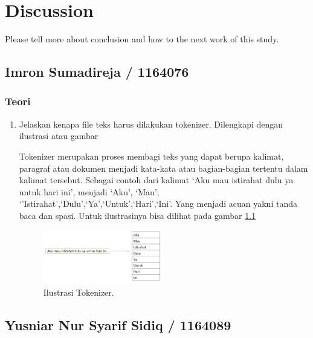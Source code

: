 \chapter{Discussion}
Please tell more about conclusion and how to the next work of this study.

\section{Imron Sumadireja / 1164076}
\subsection{Teori}
\begin{enumerate}
\item Jelaskan kenapa file teks harus dilakukan tokenizer. Dilengkapi dengan ilustrasi atau gambar \par
Tokenizer merupakan proses membagi teks yang dapat berupa kalimat, paragraf atau dokumen menjadi kata-kata atau bagian-bagian tertentu dalam kalimat tersebut. Sebagai contoh dari kalimat `Aku mau istirahat dulu ya untuk hari ini', menjadi `Aku', `Mau', `'Istirahat',`Dulu',`Ya',`Untuk',`Hari',`Ini'. Yang menjadi acuan yakni tanda baca dan spasi. Untuk ilustrasinya bisa dilihat pada gambar \ref{toke1}
		\begin{figure}[!htbp]
		\centerline{\includegraphics[width=0.5\textwidth]{figures/im/toke1.png}}
		\caption{Ilustrasi Tokenizer.}
		\label{toke1}
		\end{figure}

\end{enumerate}

\section{Yusniar Nur Syarif Sidiq / 1164089}
